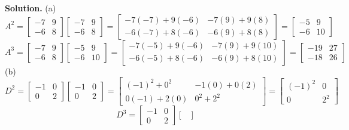 \documentclass[11pt, letterpaper]{report}
\newenvironment{notes}{}{}
\newenvironment{book}{}{}
\begin{document}
\begin{notes}
\vfill
\newpage
\end{notes}

\begin{book}
\textbf{Solution.} (a)
\[ A^2= \begin{bmatrix}
-7 & 9 \\
-6 & 8
\end{bmatrix}\begin{bmatrix}
-7 & 9 \\
-6 & 8
\end{bmatrix} = \begin{bmatrix}
-7(-7)+9(-6) & -7(9) + 9(8) \\
-6(-7)+8(-6) & -6(9) + 8(8)
\end{bmatrix} = \begin{bmatrix}
-5 & 9 \\
-6 & 10
\end{bmatrix}
\]
\[A^{3} = \begin{bmatrix}
-7 & 9 \\
-6 & 8
\end{bmatrix}\begin{bmatrix}
-5 & 9 \\
-6 & 10
\end{bmatrix} = \begin{bmatrix}
-7(-5)+9(-6) & -7(9) + 9(10) \\
-6(-5)+8(-6) & -6(9) + 8(10)
\end{bmatrix} = \begin{bmatrix}
-19 & 27 \\
-18 & 26
\end{bmatrix}\]
(b)
\[ D^2= \begin{bmatrix}
-1 & 0 \\
0 & 2
\end{bmatrix}\begin{bmatrix}
-1 & 0 \\
0 & 2
\end{bmatrix} = \begin{bmatrix}
(-1)^2 + 0^2 & -1(0) + 0(2) \\
0(-1) + 2(0) & 0^2+2^2
\end{bmatrix} = \begin{bmatrix}
(-1)^2 & 0 \\
0 & 2^2
\end{bmatrix}\]
\[ D^3= \begin{bmatrix}
-1 & 0 \\
0 & 2
\end{bmatrix}\begin{bmatrix}

\end{bmatrix}\]
\end{book}
\end{document}
